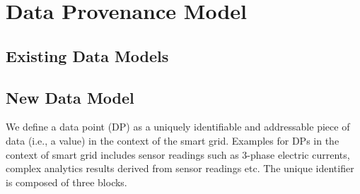 \section{Data Provenance Model}


\subsection{Existing Data Models}

\subsection{New Data Model}

We define a data point (DP) as a uniquely identifiable and addressable piece of data (i.e., a value) in the context of the smart grid. Examples for DPs in the context of smart grid includes sensor readings such as 3-phase electric currents, complex analytics results derived from sensor readings etc. The unique identifier is composed of three blocks.
